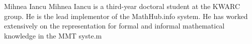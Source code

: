\begin{participant}[type=JRes,PM=24,salary=5900]{Mihnea Iancu}
  Mihnea Iancu is a third-year doctoral student at the KWARC group. He is the lead
  implementor of the MathHub.info system. He has worked extensively on the representation
  for formal and informal mathematical knowledge in the MMT syste.m
\end{participant}



 


